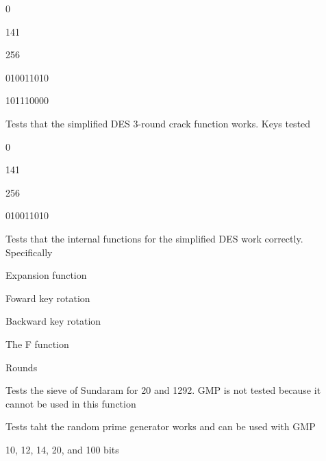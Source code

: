 \begin{DoxyRefList}
\begin{DoxyItemize}
\item 0
\item 141
\item 256
\item 010011010
\item 101110000  
\end{DoxyItemize}
\item[\label{test__test000028}%
\hypertarget{test__test000028}{}%
Member \hyperlink{test__des4_8cpp_ac2e20159a60b9bfb0c59658a3717e098}{T\+E\+S\+T\+\_\+\+C\+A\+SE} (\char`\"{}3 Round Crack\char`\"{})]Tests that the simplified D\+ES 3-\/round crack function works. Keys tested
\begin{DoxyItemize}
\item 0
\item 141
\item 256
\item 010011010  
\end{DoxyItemize}
\item[\label{test__test000027}%
\hypertarget{test__test000027}{}%
Member \hyperlink{test__des4_8cpp_a35f7d5bab3eb3a025f8a33df0fa8dc87}{T\+E\+S\+T\+\_\+\+C\+A\+SE} (\char`\"{}\+D\+E\+S4 Internals\char`\"{})]Tests that the internal functions for the simplified D\+ES work correctly. Specifically
\begin{DoxyItemize}
\item Expansion function
\item Foward key rotation
\item Backward key rotation
\item The F function
\item Rounds  
\end{DoxyItemize}
\item[\label{test__test000026}%
\hypertarget{test__test000026}{}%
Member \hyperlink{test__sundaram_8cpp_a3c2492464b6450b42c119620039e5294}{T\+E\+S\+T\+\_\+\+C\+A\+SE} (\char`\"{}\+The Sieve of Sundaram\char`\"{})]Tests the sieve of Sundaram for 20 and 1292. G\+MP is not tested because it cannot be used in this function  
\item[\label{test__test000025}%
\hypertarget{test__test000025}{}%
Member \hyperlink{test__randomprime_8cpp_a40d2a879bfa5d415535081305086b0e5}{T\+E\+S\+T\+\_\+\+C\+A\+SE} (\char`\"{}\+The random\+Prime function\char`\"{})]Tests taht the random prime generator works and can be used with G\+MP
\begin{DoxyItemize}
\item 10, 12, 14, 20, and 100 bits  
\end{DoxyItemize}

\end{DoxyRefList}
